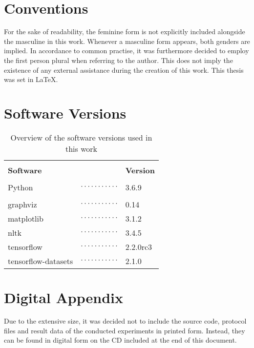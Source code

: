 \section{Conventions%
         \label{sec:appendix_conventions}}
         
For the sake of readability, the feminine form is not explicitly included alongside the masculine in this work. Whenever a masculine form appears, both genders are implied. In accordance to common practise, it was furthermore decided to employ the first person plural when referring to the author. This does not imply the existence of any external assistance during the creation of this work. This thesis was set in \LaTeX.

\section{Software Versions%
         \label{sec:appendix_software_versions}}

\begin{table}[h]
    \begin{tabular}{lll}
        & & \\
        \textbf{Software} & & \textbf{Version} \\
        & & \\
        Python & $\cdot\cdot\cdot\cdot\cdot\cdot\cdot\cdot\cdot\cdot\cdot$ & 3.6.9 \\
        & & \\
        graphviz & $\cdot\cdot\cdot\cdot\cdot\cdot\cdot\cdot\cdot\cdot\cdot$ & 0.14 \\
        matplotlib & $\cdot\cdot\cdot\cdot\cdot\cdot\cdot\cdot\cdot\cdot\cdot$ & 3.1.2 \\
        nltk & $\cdot\cdot\cdot\cdot\cdot\cdot\cdot\cdot\cdot\cdot\cdot$ & 3.4.5 \\
        tensorflow & $\cdot\cdot\cdot\cdot\cdot\cdot\cdot\cdot\cdot\cdot\cdot$ & 2.2.0rc3 \\
        tensorflow-datasets & $\cdot\cdot\cdot\cdot\cdot\cdot\cdot\cdot\cdot\cdot\cdot$ & 2.1.0 \\
    \end{tabular}
    \renewcommand\thetable{A.1}
    \caption{Overview of the software versions used in this work}
    \label{tab:appendix_software_versions}
\end{table}

\section{Digital Appendix%
         \label{sec:appendix_digital}}

Due to the extensive size, it was decided not to include the source code, protocol files and result data of the conducted experiments in printed form. Instead, they can be found in digital form on the CD included at the end of this document.